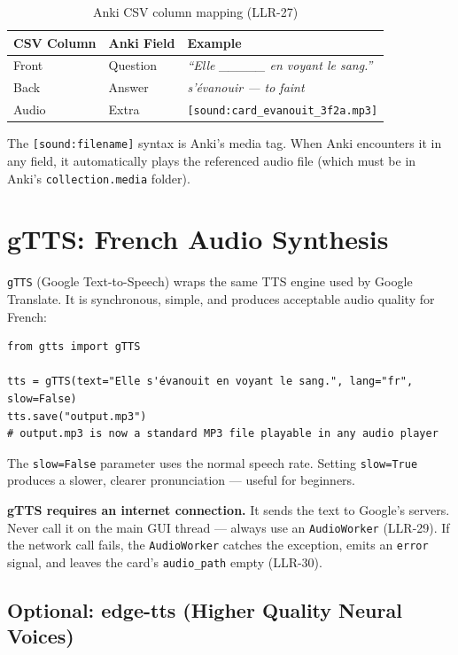 \documentclass[12pt,oneside]{book}
\begin{document}
\begin{table}[H]
\centering
\caption{Anki CSV column mapping (LLR-27)}
\begin{tabularx}{\textwidth}{l l X}
\toprule
\textbf{CSV Column} & \textbf{Anki Field} & \textbf{Example} \\
\midrule
Front & Question & \textit{``Elle \_\_\_\_\_ en voyant le sang.''} \\
Back  & Answer   & \textit{s'évanouir — to faint} \\
Audio & Extra    & \texttt{[sound:card\_evanouit\_3f2a.mp3]} \\
\bottomrule
\end{tabularx}
\end{table}

The \texttt{[sound:filename]} syntax is Anki's media tag. When Anki encounters it in
any field, it automatically plays the referenced audio file (which must be in Anki's
\texttt{collection.media} folder).

\section{gTTS: French Audio Synthesis}

\texttt{gTTS} (Google Text-to-Speech) wraps the same TTS engine used by Google
Translate. It is synchronous, simple, and produces acceptable audio quality for French:

\begin{lstlisting}[caption={gTTS usage (LLR-29)}]
from gtts import gTTS

tts = gTTS(text="Elle s'évanouit en voyant le sang.", lang="fr", slow=False)
tts.save("output.mp3")
# output.mp3 is now a standard MP3 file playable in any audio player
\end{lstlisting}

The \texttt{slow=False} parameter uses the normal speech rate. Setting
\texttt{slow=True} produces a slower, clearer pronunciation — useful for beginners.

\begin{warnbox}
\textbf{gTTS requires an internet connection.} It sends the text to Google's servers.
Never call it on the main GUI thread — always use an \texttt{AudioWorker} (LLR-29).
If the network call fails, the \texttt{AudioWorker} catches the exception, emits an
\texttt{error} signal, and leaves the card's \texttt{audio\_path} empty (LLR-30).
\end{warnbox}

\subsection{Optional: edge-tts (Higher Quality Neural Voices)}
\end{document}
